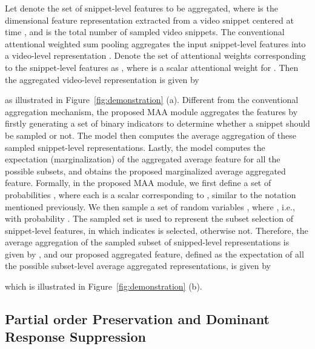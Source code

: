 \documentclass{article} \usepackage{iclr2019_conference,times}
\begin{document}
Let  denote the set of snippet-level features to be aggregated, where  is the  dimensional feature representation extracted from a video snippet centered at time , and  is the total number of sampled video snippets. 
The conventional attentional weighted sum pooling aggregates the input snippet-level features into a video-level representation . Denote the set of attentional weights corresponding to the snippet-level features as , where  is a scalar attentional weight for . Then the aggregated video-level representation is given by

as illustrated in Figure~\ref{fig:demonstration} (a). Different from the conventional aggregation mechanism, the proposed MAA module aggregates the features by firstly generating a set of binary indicators to determine whether a snippet should be sampled or not. The model then computes the average aggregation of these sampled snippet-level representations. Lastly, the model computes the expectation (marginalization) of the aggregated average feature for all the possible subsets, and obtains the proposed marginalized average aggregated feature.
Formally, in the proposed MAA module, we first define a set of probabilities , where each  is a scalar corresponding to , similar to the notation  mentioned previously. We then sample a set of random variables , where , i.e.,  with probability . The sampled set is used to represent the subset selection of snippet-level features, in which  indicates  is selected, otherwise not. Therefore, the average aggregation of the sampled subset of snipped-level representations is given by   ,
and our proposed aggregated feature, defined as the expectation of all the possible subset-level average aggregated representations, is given by

which is illustrated in Figure~\ref{fig:demonstration} (b).





\subsection{Partial order Preservation and Dominant Response Suppression}~\label{TwoPoposition}
\end{document}
